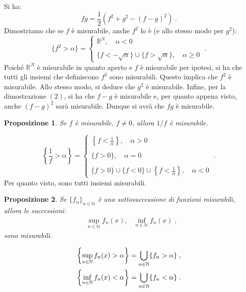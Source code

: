 \documentclass[a4paper,12pt]{report}
\theoremstyle{plain}
\newtheorem{prop}{Proposizione}[section]
\theoremstyle{definition}
\theoremstyle{remark}
\numberwithin{equation}{section}
\begin{document}
Si ha:
\begin{equation}
fg=\frac{1}{2}\left(f^2+g^2-(f-g)^{2}\right)\;.
\end{equation}
Dimostriamo che se $f$ è misurabile, anche $f^2$ lo è (e allo stesso modo per $g^2$):
\begin{equation}
\{f^2>\alpha\}=\begin{cases}
                \mathbb{R}^N, \quad \alpha<0 \\
\\
\{f<-\sqrt{\alpha}\}\cup\{f>\sqrt{\alpha}\}, \quad \alpha \ge 0
               \end{cases}\;.
\end{equation}
Poiché $\mathbb{R}^N$ è misurabile in quanto aperto e $f$ è misurabile per ipotesi, si ha che tutti gli insiemi che definiscono $f^2$ sono
 misurabili. Questo implica che $f^2$ è misurabile. Allo stesso modo, si deduce che $g^2$ è misurabile. Infine, per la dimostrazione $(2)$, si ha che $f-g$ è misurabile e, per quanto appena visto, anche $(f-g)^{2}$ sarà misurabile. Dunque si avrà che $fg$ è misurabile.
\endproof
\begin{prop} Se $f$ è misurabile, $f\ne 0$, allora $1/f$ è misurabile.
\end{prop}
\proof 
\begin{equation}
\left\{\frac{1}{f}>\alpha\right\}=\begin{cases}
                                   \left\{f<\frac{1}{\alpha}\right\}, \quad \alpha>0 \\
                                   \\
\{f>0\}, \quad \alpha=0 \\
\\
\{f>0\}\cup\{f<0\}\cup\left\{f<\frac{1}{\alpha}\right\}, \quad \alpha<0
                                  \end{cases}\;.
\end{equation}
Per quanto visto, sono tutti insiemi misurabili.
\endproof
\begin{prop} Se $\{f_n\}_{n\in\mathbb{N}}$ è una sottosuccessione di funzioni misurabili, allora le successioni:
\begin{align}
&\sup_{n\in\mathbb{N}} f_n(x), &\inf_{n\in\mathbb{N}} f_n(x)\;,
\end{align}
sono misurabili.
\end{prop}
\proof 
\begin{align}
\left\{\sup_{n\in\mathbb{N}} f_n(x)>\alpha\right\} &= \bigcup_{n\in\mathbb{N}} \{f_n>\alpha\}\;, \notag \\
\left\{\inf_{n\in\mathbb{N}} f_n(x)<\alpha\right\} &= \bigcup_{n\in\mathbb{N}} \{f_n<\alpha\}\;.
\end{align}
\end{document}
